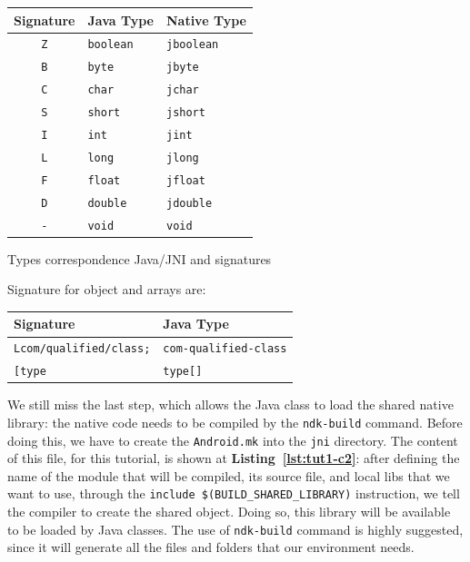 \documentclass[a4paper,10pt]{article}
\makeatletter
\newenvironment{tablehere}{\def\@captype{table}}{}
\newcommand{\keyword}[1]{\texttt{#1}}
\newcommand{\refl}[1]{\textbf{Listing~\ref{#1}}}
\makeatother
\begin{document}
\begin{multicols}{2}
\begin{itemize}
\end{itemize}
\vspace{1em}
\begin{tablehere}
	\centering
	\renewcommand{\arraystretch}{1.2}	
	\begin{tabular}{c l p{2cm}}
		\hline
		Signature & Java Type & Native Type \\
		\hline
		\texttt{Z} & \texttt{boolean} & \texttt{jboolean} \\
		\texttt{B} & \texttt{byte} & \texttt{jbyte} \\
		\texttt{C} & \texttt{char} & \texttt{jchar} \\
		\texttt{S} & \texttt{short} & \texttt{jshort} \\
		\texttt{I} & \texttt{int} & \texttt{jint} \\
		\texttt{L} & \texttt{long} & \texttt{jlong} \\
		\texttt{F} & \texttt{float} & \texttt{jfloat} \\
		\texttt{D} & \texttt{double} & \texttt{jdouble} \\
		\texttt{-} & \texttt{void} & \texttt{void} \\
		\hline
	\end{tabular}
	\caption{Types correspondence Java/JNI and signatures}
	\label{table:types-correspondence}
\end{tablehere}
\vspace{1em}
Signature for object and arrays are:\\
\vspace{1em}
\begin{tablehere}
	\centering
	\renewcommand{\arraystretch}{1.2}	
	\begin{tabular}{l l}
		\hline
		Signature & Java Type\\
		\hline
		\texttt{Lcom/qualified/class;} & \texttt{com-qualified-class}\\
		\texttt{[type} & \texttt{type[]}\\
		\hline
	\end{tabular}
\end{tablehere}

We still miss the last step, which allows the Java class to load the shared native library: the native code needs to be compiled by the \keyword{ndk-build} command. Before doing this, we have to create the \keyword{Android.mk} into the \keyword{jni} directory. The content of this file, for this tutorial, is shown at \refl{lst:tut1-c2}: after defining the name of the module that will be compiled, its source file, and local libs that we want to use, through the \keyword{include \$(BUILD\_SHARED\_LIBRARY)} instruction, we tell the compiler to create the shared object. Doing so, this library will be available to be loaded by Java classes. The use of \keyword{ndk-build} command is highly suggested, since it will generate all the files and folders that our environment needs.


\end{multicols}
\end{document}
